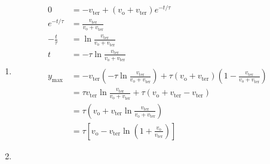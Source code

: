 \documentclass{article}
\begin{document}
\begin{enumerate}
  \item

        \begin{align*}
          0               & = -v_\text{ter} + (v_\text{o} + v_\text{ter}) e^{-t / \tau}                                                                                                                                  \\
          e^{-t / \tau}   & = \frac{v_\text{ter}}{v_\text{o} + v_\text{ter}}                                                                                                                                             \\
          -\frac{t}{\tau} & = \ln \frac{v_\text{ter}}{v_\text{o} + v_\text{ter}}                                                                                                                                         \\
          t               & = -\tau \ln \frac{v_\text{ter}}{v_\text{o} + v_\text{ter}}                                                                                                                                   \\ \\
          y_\text{max}    & = -v_\text{ter} \left( -\tau \ln \frac{v_\text{ter}}{v_\text{o} + v_\text{ter}} \right) + \tau (v_\text{o} + v_\text{ter}) \left( 1 - \frac{v_\text{ter}}{v_\text{o} + v_\text{ter}} \right) \\
                          & = \tau v_\text{ter} \ln \frac{v_\text{ter}}{v_\text{o} + v_\text{ter}} + \tau (v_\text{o} + v_\text{ter} - v_\text{ter})                                                                     \\
                          & = \tau \left( v_\text{o} + v_\text{ter} \ln \frac{v_\text{ter}}{v_\text{o} + v_\text{ter}} \right)                                                                                           \\
                          & = \tau \left[ v_\text{o} - v_\text{ter} \ln \left( 1 + \frac{v_\text{o}}{v_\text{ter}} \right) \right]
        \end{align*}

  \item


\end{enumerate}
\end{document}
